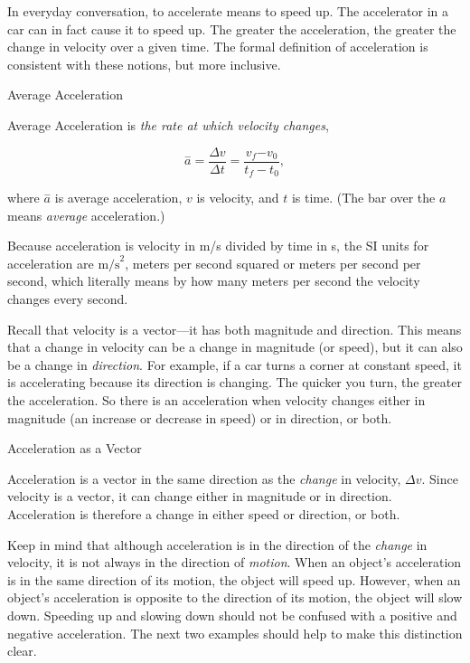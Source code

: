 \documentclass[
]{book}
\begin{document}
In everyday conversation, to accelerate means to speed up. The
accelerator in a car can in fact cause it to speed up. The greater the
\protect\hypertarget{import-auto-id1298945}{}{acceleration}, the greater the
change in velocity over a given time. The formal definition of
acceleration is consistent with these notions, but more inclusive.

\hypertarget{fs-id4053362}{}
Average Acceleration

\protect\hypertarget{import-auto-id2580108}{}{Average Acceleration} is \emph{the
rate at which velocity changes},

\leavevmode{}%
\[{{{\overset{-}{a} = \frac{\Delta v}{\Delta t}} = \frac{v_{f}{- v_{0}}}{t_{f} - t_{0}}},}{}\]

where \emph{\(\overset{-}{a}{}\)} is average acceleration, \emph{\(v{}\)} is velocity,
and \emph{\(t{}\)} is time. (The bar over the \(a{}\) means \emph{average}
acceleration.)

Because acceleration is velocity in m/s divided by time in s, the SI
units for acceleration are \(\text{m/s}^{2}{}\), meters per second squared
or meters per second per second, which literally means by how many
meters per second the velocity changes every second.

Recall that velocity is a vector---it has both magnitude and direction.
This means that a change in velocity can be a change in magnitude (or
speed), but it can also be a change in \emph{direction}. For example, if a
car turns a corner at constant speed, it is accelerating because its
direction is changing. The quicker you turn, the greater the
acceleration. So there is an acceleration when velocity changes either
in magnitude (an increase or decrease in speed) or in direction, or
both.

\hypertarget{fs-id3524141}{}
Acceleration as a Vector

Acceleration is a vector in the same direction as the \emph{change} in
velocity, \({\Delta v}{}\). Since velocity is a vector, it can change
either in magnitude or in direction. Acceleration is therefore a change
in either speed or direction, or both.

Keep in mind that although acceleration is in the direction of the
\emph{change} in velocity, it is not always in the direction of \emph{motion}.
When an object's acceleration is in the same direction of its motion,
the object will speed up. However, when an object's acceleration is
opposite to the direction of its motion, the object will slow down.
Speeding up and slowing down should not be confused with a positive and
negative acceleration. The next two examples should help to make this
distinction clear.
\end{document}
